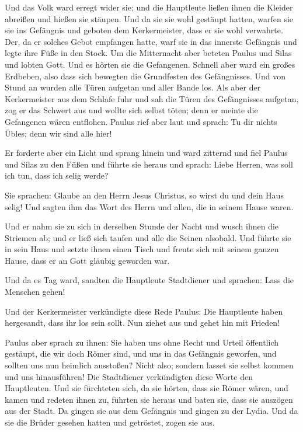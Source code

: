  Und das Volk ward erregt wider sie; und die Hauptleute
ließen ihnen die Kleider abreißen und hießen sie stäupen.
 Und da sie sie wohl gestäupt hatten, warfen sie sie ins
Gefängnis und geboten dem Kerkermeister, dass er sie wohl verwahrte.
 Der, da er solches Gebot empfangen hatte, warf sie in
das innerste Gefängnis und legte ihre Füße in den Stock. 
Um die Mitternacht aber beteten Paulus und Silas und lobten Gott. Und es
hörten sie die Gefangenen.  Schnell aber ward ein großes
Erdbeben, also dass sich bewegten die Grundfesten des Gefängnisses. Und
von Stund an wurden alle Türen aufgetan und aller Bande los.
 Als aber der Kerkermeister aus dem Schlafe fuhr und sah
die Türen des Gefängnisses aufgetan, zog er das Schwert aus und wollte
sich selbst töten; denn er meinte die Gefangenen wären entflohen.
 Paulus rief aber laut und sprach: Tu dir nichts Übles;
denn wir sind alle hier!

 Er forderte aber ein Licht und sprang hinein und ward
zitternd und fiel Paulus und Silas zu den Füßen  und
führte sie heraus und sprach: Liebe Herren, was soll ich tun, dass ich
selig werde?

 Sie sprachen: Glaube an den Herrn Jesus Christus, so
wirst du und dein Haus selig!  Und sagten ihm das Wort
des Herrn und allen, die in seinem Hause waren.

 Und er nahm sie zu sich in derselben Stunde der Nacht
und wusch ihnen die Striemen ab; und er ließ sich taufen und alle die
Seinen alsobald.  Und führte sie in sein Haus und setzte
ihnen einen Tisch und freute sich mit seinem ganzen Hause, dass er an
Gott gläubig geworden war.

 Und da es Tag ward, sandten die Hauptleute Stadtdiener
und sprachen: Lass die Menschen gehen!

 Und der Kerkermeister verkündigte diese Rede Paulus: Die
Hauptleute haben hergesandt, dass ihr los sein sollt. Nun ziehet aus und
gehet hin mit Frieden!

 Paulus aber sprach zu ihnen: Sie haben uns ohne Recht
und Urteil öffentlich gestäupt, die wir doch Römer sind, und uns in das
Gefängnis geworfen, und sollten uns nun heimlich ausstoßen? Nicht also;
sondern lasset sie selbst kommen und uns hinausführen! 
Die Stadtdiener verkündigten diese Worte den Hauptleuten. Und sie
fürchteten sich, da sie hörten, dass sie Römer wären, 
und kamen und redeten ihnen zu, führten sie heraus und baten sie, dass
sie auszögen aus der Stadt.  Da gingen sie aus dem
Gefängnis und gingen zu der Lydia. Und da sie die Brüder gesehen hatten
und getröstet, zogen sie aus.

